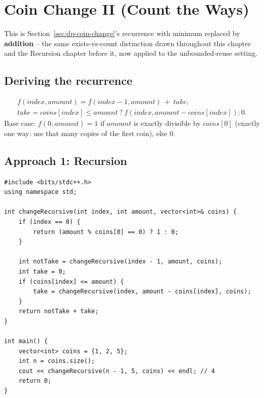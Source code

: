 \section{Coin Change II (Count the Ways)}
\label{sec:dp-coin-change-2}


\begin{patternbox}
This is Section~\ref{sec:dp-coin-change}'s recurrence with minimum
replaced by \textbf{addition} -- the same exists-vs-count distinction
drawn throughout this chapter and the Recursion chapter before it, now
applied to the unbounded-reuse setting.
\end{patternbox}

\subsection*{Deriving the recurrence}

\begin{gather*}
  f(\textit{index}, \textit{amount}) = f(\textit{index}{-}1, \textit{amount})
  \ +\ \textit{take}, \\
  \textit{take} = \textit{coins}[\textit{index}] \le \textit{amount}\ ?\
  f(\textit{index}, \textit{amount}-\textit{coins}[\textit{index}]) : 0.
\end{gather*}
Base case: $f(0, \textit{amount}) = 1$ if $\textit{amount}$ is exactly
divisible by $\textit{coins}[0]$ (exactly one way: use that many copies
of the first coin), else $0$.

\subsection*{Approach 1: Recursion}

\begin{lstlisting}
#include <bits/stdc++.h>
using namespace std;

int changeRecursive(int index, int amount, vector<int>& coins) {
    if (index == 0) {
        return (amount % coins[0] == 0) ? 1 : 0;
    }

    int notTake = changeRecursive(index - 1, amount, coins);
    int take = 0;
    if (coins[index] <= amount) {
        take = changeRecursive(index, amount - coins[index], coins);
    }
    return notTake + take;
}

int main() {
    vector<int> coins = {1, 2, 5};
    int n = coins.size();
    cout << changeRecursive(n - 1, 5, coins) << endl; // 4
    return 0;
}
\end{lstlisting}

